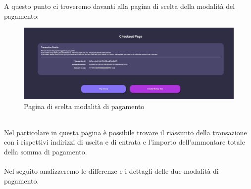         A questo punto ci troveremo davanti alla pagina di scelta della modalità del pagamento:
        \begin{figure}[H]
            \centering
            \includegraphics[scale=0.2]{immagini/Checkout/PaymentMode.png}
            \caption{Pagina di scelta modalità di pagamento}
        \end{figure}
        \textbf{}\\
        Nel particolare in questa pagina è possibile trovare il riassunto della transazione con i rispettivi indirizzi di uscita e di entrata e l'importo dell'ammontare totale della somma di pagamento.\\\\
        Nel seguito analizzeremo le differenze e i dettagli delle due modalità di pagamento.
